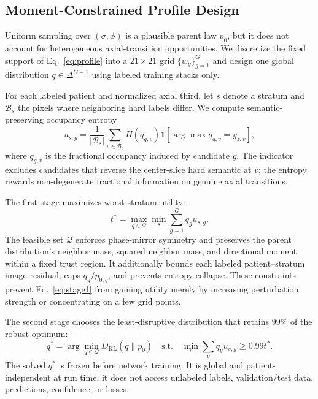 \subsection{Moment-Constrained Profile Design}
Uniform sampling over $(\sigma,\phi)$ is a plausible parent law $p_0$, but it does not account for heterogeneous axial-transition opportunities. We discretize the fixed support of Eq.~\eqref{eq:profile} into a $21\times21$ grid $\{w_g\}_{g=1}^{G}$ and design one global distribution $q\in\Delta^{G-1}$ using labeled training stacks only.

For each labeled patient and normalized axial third, let $s$ denote a stratum and $\mathcal B_s$ the pixels where neighboring hard labels differ. We compute semantic-preserving occupancy entropy
\begin{equation}
u_{s,g}=\frac{1}{|\mathcal B_s|}
\sum_{v\in\mathcal B_s}
H(q_{g,v})
\mathbf 1\!\left[\arg\max q_{g,v}=y_{z,v}\right],
\label{eq:utility}
\end{equation}
where $q_{g,v}$ is the fractional occupancy induced by candidate $g$. The indicator excludes candidates that reverse the center-slice hard semantic at $v$; the entropy rewards non-degenerate fractional information on genuine axial transitions.

The first stage maximizes worst-stratum utility:
\begin{equation}
t^*=\max_{q\in\mathcal Q}\min_s\sum_{g=1}^{G}q_gu_{s,g}.
\label{eq:stage1}
\end{equation}
The feasible set $\mathcal Q$ enforces phase-mirror symmetry and preserves the parent distribution's neighbor mass, squared neighbor mass, and directional moment within a fixed trust region. It additionally bounds each labeled patient--stratum image residual, caps $q_g/p_{0,g}$, and prevents entropy collapse. These constraints prevent Eq.~\eqref{eq:stage1} from gaining utility merely by increasing perturbation strength or concentrating on a few grid points.

The second stage chooses the least-disruptive distribution that retains $99\%$ of the robust optimum:
\begin{equation}
q^*=\arg\min_{q\in\mathcal Q}D_{\mathrm{KL}}(q\|p_0)
\quad\text{s.t.}\quad
\min_s\sum_gq_gu_{s,g}\ge0.99t^*.
\label{eq:stage2}
\end{equation}
The solved $q^*$ is frozen before network training. It is global and patient-independent at run time; it does not access unlabeled labels, validation/test data, predictions, confidence, or losses.

